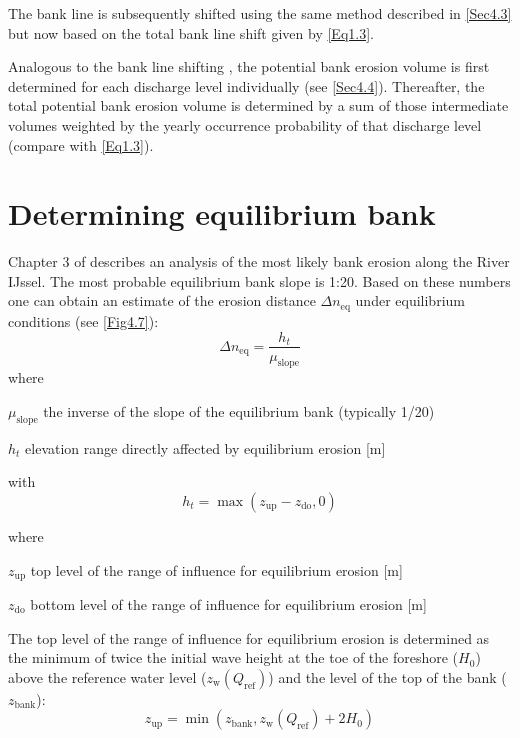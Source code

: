 The bank line is subsequently shifted using the same method described in \autoref{Sec4.3} but now based on the total bank line shift given by \autoref{Eq1.3}.

Analogous to the bank line shifting , the potential bank erosion volume is first determined for each discharge level individually (see \autoref{Sec4.4}).
Thereafter, the total potential bank erosion volume is determined by a sum of those intermediate volumes weighted by the yearly occurrence probability of that discharge level (compare with \autoref{Eq1.3}).

\section{Determining equilibrium bank}\label{Sec4.6}

Chapter 3 of \citet{MarkSBMV11} describes an analysis of the most likely bank erosion along the River IJssel.
The most probable equilibrium bank slope is 1:20.
Based on these numbers one can obtain an estimate of the erosion distance $\Delta n_\text{eq}$ under equilibrium conditions (see \autoref{Fig4.7}):
%
\begin{equation}
\Delta n_\text{eq} = \frac{h_t}{\mu_\text{slope}}
\end{equation}
%
where
\begin{symbollist}
\item[ $\mu_\text{slope}$] the inverse of the slope of the equilibrium bank (typically 1/20)
\item[$h_t$] elevation range directly affected by equilibrium erosion [m]
\end{symbollist}

with 
\begin{equation}
h_t = \max (z_\text{up} - z_\text{do}, 0)
\end{equation}

where
\begin{symbollist}
\item[$z_\text{up}$] top level of the range of influence for equilibrium erosion [m]
\item[$z_\text{do}$] bottom level of the range of influence for equilibrium erosion [m]
\end{symbollist}	

The top level of the range of influence for equilibrium erosion is determined as the minimum of twice the initial wave height at the toe of the foreshore ($H_0$) above the reference water level ($z_\text{w}(Q_\text{ref})$) and the level of the top of the bank ($z_\text{bank}$):
\begin{equation}	
z_\text{up} = \min (z_\text{bank}, z_\text{w}(Q_\text{ref}) + 2 H_\text{0})
\label{eq_zup}
\end{equation}

